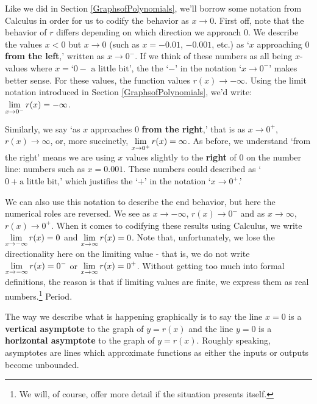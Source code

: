 \documentclass{ximera}
\begin{document}
Like we did in Section \ref{GraphsofPolynomials}, we'll borrow some notation from Calculus in order for us to codify the behavior as $x \rightarrow 0$.  First off, note that the behavior of $r$ differs depending on which direction we approach $0$.  We describe the values $x<0$ but $x \rightarrow 0$  (such as $x = -0.01$, $-0.001$, etc.)  as  `$x$ approaching $0$ \textbf{from the left},' written as $x \rightarrow 0^{-}$.  If we think of these numbers as all being $x$-values where  $x  = \text{`$0-$ a little bit'}$, the  the `$-$' in the notation `$x \rightarrow 0^{-}$' makes better sense.  For these values,  the function values $r(x) \rightarrow -\infty$.   Using the limit notation introduced in Section \ref{GraphsofPolynomials}, we'd write: $\ds{ \lim_{x \rightarrow 0^{-}} r(x) = - \infty}$.  


Similarly, we say `as $x$ approaches $0$ \textbf{from the right},' that is as $x \rightarrow 0^{+}$, $r(x) \rightarrow \infty$, or, more succinctly, $\ds{ \lim_{x \rightarrow 0^{+}} r(x) =  \infty}$.  As before, we understand `from the right' means we are using $x$ values slightly to the \textbf{right} of $0$ on the number line:  numbers such as $x =0.001.$ These numbers could described as `$0 + \text{a little bit}$,' which justifies the `$+$' in the notation `$x \rightarrow 0^{+}$.'

We can also use this notation to describe the end behavior, but here the numerical roles are reversed.  We see as $x \rightarrow -\infty$, $r(x) \rightarrow 0^{-}$ and as $x \rightarrow \infty$, $r(x) \rightarrow 0^{+}$.  When it comes to codifying these results using Calculus, we write $\ds{ \lim_{x \rightarrow -\infty} r(x) =  0}$ and $\ds{ \lim_{x \rightarrow \infty} r(x) =  0}$.  Note that, unfortunately, we lose the directionality here on the limiting value - that is, we do not write $\ds{ \lim_{x \rightarrow -\infty} r(x) =  0^{-}}$ or $\ds{ \lim_{x \rightarrow \infty} r(x) =  0^{+}}$.  Without getting too much into formal definitions, the reason is that if limiting values are finite, we express them as real numbers.\footnote{We will, of course, offer more detail if the situation presents itself.}  Period.

The way we describe what is happening graphically is to say the line $x = 0$ is a  \textbf{vertical asymptote}  to the graph of $y = r(x)$ and the line $y = 0$ is a \textbf{horizontal asymptote} to the graph of $y = r(x)$.  Roughly speaking, asymptotes are lines which approximate functions as either the inputs or outputs become unbounded. 
\end{document}
